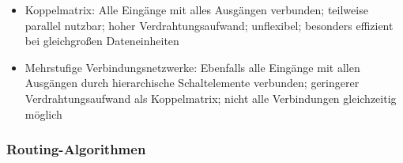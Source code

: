 \begin{itemize}
\begin{itemize}
\begin{itemize}
			\item Koppelmatrix: Alle Eingänge mit alles Ausgängen verbunden; teilweise parallel nutzbar; hoher Verdrahtungsaufwand; unflexibel; besonders effizient bei gleichgroßen Dateneinheiten
			\item Mehrstufige Verbindungsnetzwerke: Ebenfalls alle Eingänge mit allen Ausgängen durch hierarchische Schaltelemente verbunden; geringerer Verdrahtungsaufwand als Koppelmatrix; nicht alle Verbindungen gleichzeitig möglich
		\end{itemize}
	\end{itemize}
\end{itemize}

\subsubsection{Routing-Algorithmen}
